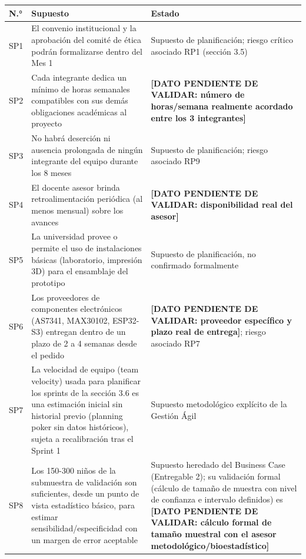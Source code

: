 \documentclass[11pt,a4paper]{article}
\begin{document}
{\small
\begin{longtable}[]{@{}
  >{\raggedright\arraybackslash}p{}
  >{\raggedright\arraybackslash}p{}
  >{\raggedright\arraybackslash}p{}@{}}
\toprule\noalign{}
\begin{minipage}[b]{\linewidth}\raggedright
N.°
\end{minipage} & \begin{minipage}[b]{\linewidth}\raggedright
Supuesto
\end{minipage} & \begin{minipage}[b]{\linewidth}\raggedright
Estado
\end{minipage} \\
\midrule\noalign{}
\endhead
\bottomrule\noalign{}
\endlastfoot
SP1 & El convenio institucional y la aprobación del comité de ética podrán formalizarse dentro del Mes 1 & Supuesto de planificación; riesgo crítico asociado RP1 (sección 3.5) \\
SP2 & Cada integrante dedica un mínimo de horas semanales compatibles con sus demás obligaciones académicas al proyecto & \textbf{{[}DATO PENDIENTE DE VALIDAR: número de horas/semana realmente acordado entre los 3 integrantes{]}} \\
SP3 & No habrá deserción ni ausencia prolongada de ningún integrante del equipo durante los 8 meses & Supuesto de planificación; riesgo asociado RP9 \\
SP4 & El docente asesor brinda retroalimentación periódica (al menos mensual) sobre los avances & \textbf{{[}DATO PENDIENTE DE VALIDAR: disponibilidad real del asesor{]}} \\
SP5 & La universidad provee o permite el uso de instalaciones básicas (laboratorio, impresión 3D) para el ensamblaje del prototipo & Supuesto de planificación, no confirmado formalmente \\
SP6 & Los proveedores de componentes electrónicos (AS7341, MAX30102, ESP32-S3) entregan dentro de un plazo de 2 a 4 semanas desde el pedido & \textbf{{[}DATO PENDIENTE DE VALIDAR: proveedor específico y plazo real de entrega{]}}; riesgo asociado RP7 \\
SP7 & La velocidad de equipo (team velocity) usada para planificar los sprints de la sección 3.6 es una estimación inicial sin historial previo (planning poker sin datos históricos), sujeta a recalibración tras el Sprint 1 & Supuesto metodológico explícito de la Gestión Ágil \\
SP8 & Los 150-300 niños de la submuestra de validación son suficientes, desde un punto de vista estadístico básico, para estimar sensibilidad/especificidad con un margen de error aceptable & Supuesto heredado del Business Case (Entregable 2); su validación formal (cálculo de tamaño de muestra con nivel de confianza e intervalo definidos) es \textbf{{[}DATO PENDIENTE DE VALIDAR: cálculo formal de tamaño muestral con el asesor metodológico/bioestadístico{]}} \\
\end{longtable}
}
\end{document}
